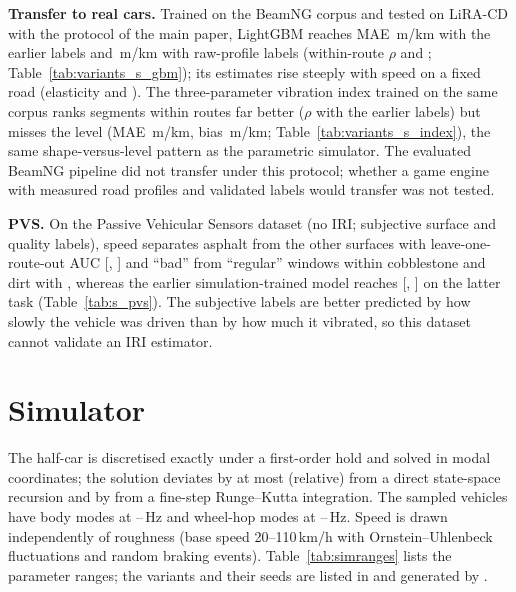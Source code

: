 \documentclass[onecolumn,10pt]{IEEEtran}
\begin{document}
\textbf{Transfer to real cars.}
Trained on the BeamNG corpus and tested on LiRA-CD with the protocol of the main paper, LightGBM reaches MAE \vvBcorrMae\,m/km with the earlier labels and \vvBrawMae\,m/km with raw-profile labels (within-route $\rho$ \vvBcorrRhoWithin{} and \vvBrawRhoWithin; Table~\ref{tab:variants_s_gbm}); its estimates rise steeply with speed on a fixed road (elasticity \vvBcorrElastPooled{} and \vvBrawElastPooled).
The three-parameter vibration index trained on the same corpus ranks segments within routes far better ($\rho$ \vvBcorrIdxRhoWithin{} with the earlier labels) but misses the level (MAE \vvBcorrIdxMae\,m/km, bias \vvBcorrIdxBias\,m/km; Table~\ref{tab:variants_s_index}), the same shape-versus-level pattern as the parametric simulator.
The evaluated BeamNG pipeline did not transfer under this protocol; whether a game engine with measured road profiles and validated labels would transfer was not tested.

\textbf{PVS.}
On the Passive Vehicular Sensors dataset (no IRI; subjective surface and quality labels), speed separates asphalt from the other surfaces with leave-one-route-out AUC \pvsSurfSpeed{} [\pvsSurfSpeedLo, \pvsSurfSpeedHi] and ``bad'' from ``regular'' windows within cobblestone and dirt with \pvsBadSpeed, whereas the earlier simulation-trained model reaches \pvsBadModel{} [\pvsBadModelLo, \pvsBadModelHi] on the latter task (Table~\ref{tab:s_pvs}).
The subjective labels are better predicted by how slowly the vehicle was driven than by how much it vibrated, so this dataset cannot validate an IRI estimator.




\section{Simulator}
\label{sec:s_sim}
The half-car is discretised exactly under a first-order hold and solved in modal coordinates; the solution deviates by at most \simModalDev{} (relative) from a direct state-space recursion and by \simRkDev{} from a fine-step Runge--Kutta integration.
The sampled vehicles have body modes at \simBodyHzLo--\simBodyHzHi\,Hz and wheel-hop modes at \simHopHzLo--\simHopHzHi\,Hz.
Speed is drawn independently of roughness (base speed 20--110\,km/h with Ornstein--Uhlenbeck fluctuations and random braking events).
Table~\ref{tab:simranges} lists the parameter ranges; the variants and their seeds are listed in  and generated by .
\end{document}
